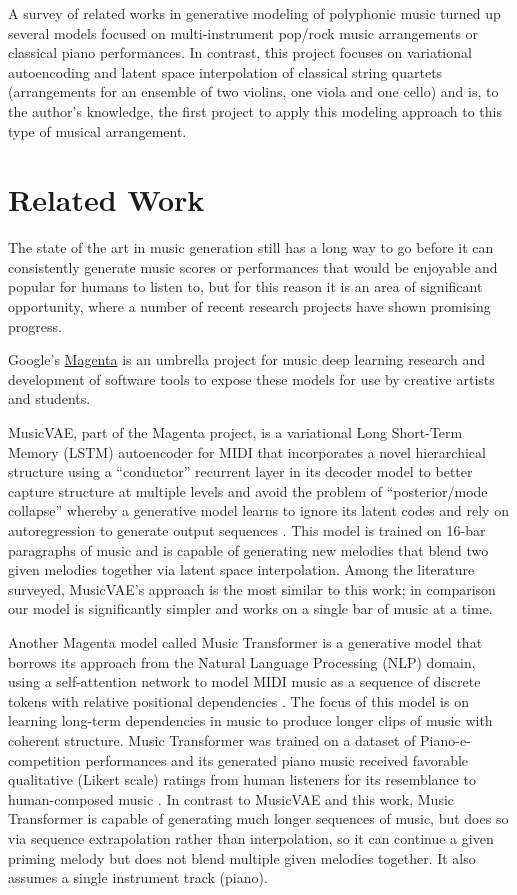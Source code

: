 \documentclass[sigconf,authorversion]{acmart}
\begin{document}
A survey of related works in generative modeling of polyphonic music
turned up several models focused on multi-instrument pop/rock music
arrangements or classical piano performances. In contrast, this
project focuses on variational autoencoding and latent space
interpolation of classical string quartets (arrangements for an
ensemble of two violins, one viola and one cello) and is, to the
author's knowledge, the first project to apply this modeling approach
to this type of musical arrangement.

\section{Related Work}

The state of the art in music generation still has a long way to go
before it can consistently generate music scores or performances that
would be enjoyable and popular for humans to listen to, but for this
reason it is an area of significant opportunity, where a number of
recent research projects have shown promising progress.

Google's \href{https://magenta.tensorflow.org/}{Magenta} is an
umbrella project for music deep learning research and development of
software tools to expose these models for use by creative artists and
students.

MusicVAE, part of the Magenta project, is a variational Long
Short-Term Memory (LSTM) autoencoder for MIDI that incorporates a
novel hierarchical structure using a ``conductor'' recurrent layer in
its decoder model to better capture structure at multiple levels and
avoid the problem of ``posterior/mode collapse'' whereby a generative
model learns to ignore its latent codes and rely on autoregression to
generate output sequences \cite{roberts_hierarchical_2018}. This model
is trained on 16-bar paragraphs of music and is capable of generating
new melodies that blend two given melodies together via latent space
interpolation. Among the literature surveyed, MusicVAE's approach is
the most similar to this work; in comparison our model is
significantly simpler and works on a single bar of music at a time.

Another Magenta model called Music Transformer is a generative model
that borrows its approach from the Natural Language Processing (NLP)
domain, using a self-attention network to model MIDI music as a
sequence of discrete tokens with relative positional dependencies
\cite{huang_music_2018}. The focus of this model is on learning
long-term dependencies in music to produce longer clips of music with
coherent structure. Music Transformer was trained on a dataset of
Piano-e-competition performances \cite{hawthorne2019enabling} and its
generated piano music received favorable qualitative (Likert scale)
ratings from human listeners for its resemblance to human-composed
music \cite{huang_music_2018}. In contrast to MusicVAE and this work,
Music Transformer is capable of generating much longer sequences of
music, but does so via sequence extrapolation rather than
interpolation, so it can continue a given priming melody but does not
blend multiple given melodies together. It also assumes a single
instrument track (piano).
\end{document}
